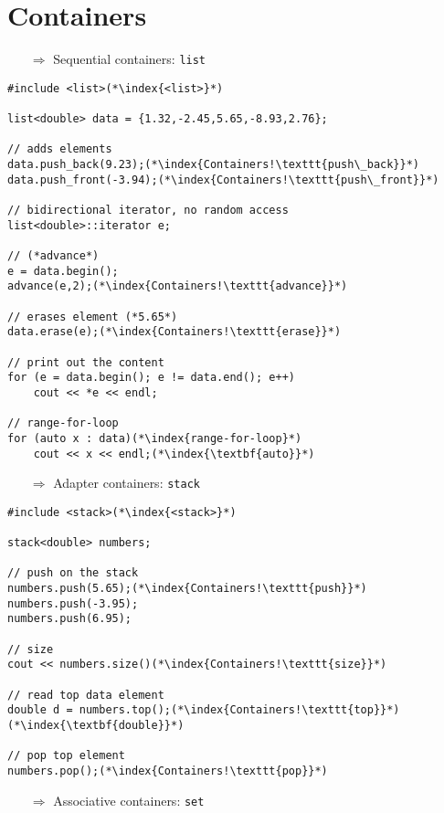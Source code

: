 \documentclass[10pt]{article}
\begin{document}
\section{Containers}
\small
\begin{enumerate}
\item[$\Rightarrow$] Sequential containers: \texttt{list}
\end{enumerate}
\begin{lstlisting}
#include <list>(*\index{<list>}*)

list<double> data = {1.32,-2.45,5.65,-8.93,2.76};

// adds elements
data.push_back(9.23);(*\index{Containers!\texttt{push\_back}}*)
data.push_front(-3.94);(*\index{Containers!\texttt{push\_front}}*)

// bidirectional iterator, no random access    
list<double>::iterator e;

// (*advance*)
e = data.begin();
advance(e,2);(*\index{Containers!\texttt{advance}}*)

// erases element (*5.65*)
data.erase(e);(*\index{Containers!\texttt{erase}}*)

// print out the content    
for (e = data.begin(); e != data.end(); e++)
    cout << *e << endl;
    
// range-for-loop
for (auto x : data)(*\index{range-for-loop}*)
    cout << x << endl;(*\index{\textbf{auto}}*)
\end{lstlisting}
\begin{enumerate}
\item[$\Rightarrow$] Adapter containers: \texttt{stack}
\end{enumerate}
\begin{lstlisting}
#include <stack>(*\index{<stack>}*)

stack<double> numbers;

// push on the stack
numbers.push(5.65);(*\index{Containers!\texttt{push}}*)
numbers.push(-3.95);
numbers.push(6.95);

// size
cout << numbers.size()(*\index{Containers!\texttt{size}}*)

// read top data element
double d = numbers.top();(*\index{Containers!\texttt{top}}*)(*\index{\textbf{double}}*)

// pop top element
numbers.pop();(*\index{Containers!\texttt{pop}}*)
\end{lstlisting}
\begin{enumerate}
\item[$\Rightarrow$] Associative containers: \texttt{set}
\end{enumerate}
\end{document}
